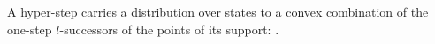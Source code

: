\begin{definition}
  \label{def:hyperstep}
  \leanok
  A hyper-step carries a distribution over states to a convex combination of the one-step $l$-successors of the points of its support: .
\end{definition}
